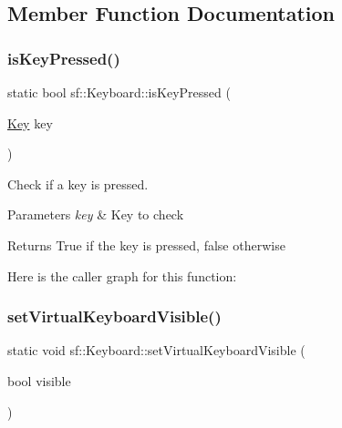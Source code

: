 \subsection{Member Function Documentation}
\mbox{\label{classsf_1_1_keyboard_a80a04b2f53005886957f49eee3531599}} 
\subsubsection{\texorpdfstring{is\+Key\+Pressed()}{isKeyPressed()}}
{\footnotesize\ttfamily static bool sf\+::\+Keyboard\+::is\+Key\+Pressed (\begin{DoxyParamCaption}\item[{\hyperlink{classsf_1_1_keyboard_acb4cacd7cc5802dec45724cf3314a142}{Key}}]{key }\end{DoxyParamCaption})\hspace{0.3cm}{\ttfamily [static]}}



Check if a key is pressed. 


\begin{DoxyParams}{Parameters}
{\em key} & Key to check\\
\hline
\end{DoxyParams}
\begin{DoxyReturn}{Returns}
True if the key is pressed, false otherwise 
\end{DoxyReturn}
Here is the caller graph for this function\+:
\mbox{\label{classsf_1_1_keyboard_ad61fee7e793242d444a8c5acd662fe5b}} 
\subsubsection{\texorpdfstring{set\+Virtual\+Keyboard\+Visible()}{setVirtualKeyboardVisible()}}
{\footnotesize\ttfamily static void sf\+::\+Keyboard\+::set\+Virtual\+Keyboard\+Visible (\begin{DoxyParamCaption}\item[{bool}]{visible }\end{DoxyParamCaption})\hspace{0.3cm}{\ttfamily [static]}}



